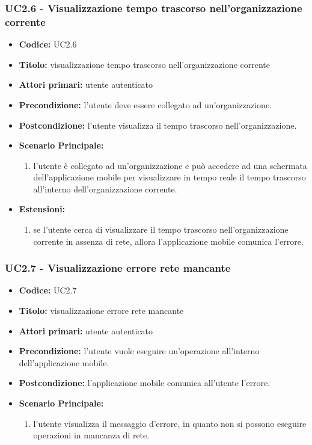 \documentclass[casi-duso]{subfiles}
\begin{document}
\subsubsection{UC2.6 - Visualizzazione tempo trascorso nell'organizzazione corrente}
\label{sub:uc2.1utente}
\begin{itemize}
  \item \textbf{Codice:} UC2.6
  \item \textbf{Titolo:} visualizzazione tempo trascorso nell'organizzazione corrente
  \item \textbf{Attori primari:} utente autenticato
  \item \textbf{Precondizione:} l'utente deve essere collegato ad un'organizzazione.
  \item \textbf{Postcondizione:} l'utente visualizza il tempo trascorso nell'organizzazione.
  \item \textbf{Scenario Principale:}
  \begin{enumerate}
    \item l'utente è collegato ad un'organizzazione e può accedere ad una schermata dell'applicazione mobile per visualizzare in tempo reale il tempo trascorso all'interno 
    dell'organizzazione corrente.
  \end{enumerate}
  \item \textbf{Estensioni:} 
  \begin{enumerate}
    \item se l'utente cerca di visualizzare il tempo trascorso nell'organizzazione corrente in assenza di rete, allora l'applicazione mobile comunica l'errore.
  \end{enumerate}
\end{itemize}

\subsubsection{UC2.7 - Visualizzazione errore rete mancante}
\label{sub:uc2.1utente}
\begin{itemize}
  \item \textbf{Codice:} UC2.7
  \item \textbf{Titolo:} visualizzazione errore rete mancante
  \item \textbf{Attori primari:} utente autenticato
  \item \textbf{Precondizione:} l'utente vuole eseguire un'operazione all'interno dell'applicazione mobile.
  \item \textbf{Postcondizione:} l'applicazione mobile comunica all'utente l'errore.
  \item \textbf{Scenario Principale:}
  \begin{enumerate}
    \item l'utente visualizza il messaggio d'errore, in quanto non si possono eseguire operazioni in mancanza di rete.
  \end{enumerate}
\end{itemize}
\end{document}
